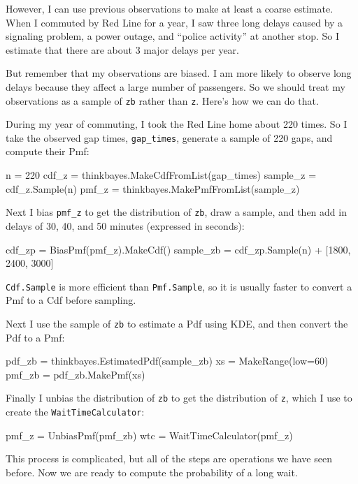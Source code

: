 \documentclass[12pt]{book}
\theoremstyle{exercise}
\begin{document}
However, I can use previous observations to make at least a coarse
estimate.  When I commuted by Red Line for a year, I saw three long
delays caused by a signaling problem, a power outage, and ``police
activity'' at another stop.  So I estimate that there are about
3 major delays per year.

But remember that my observations are biased.  I am more likely
to observe long delays because they affect a large number
of passengers.  So we should treat my observations as a sample
of {\tt zb} rather than {\tt z}.  Here's how we can do that.

During my year of commuting, I took the Red Line home about 220
times.  So I take the observed gap times, \verb"gap_times",
generate a sample of 220 gaps, and compute their Pmf:

\begin{code}
    n = 220
    cdf_z = thinkbayes.MakeCdfFromList(gap_times)
    sample_z = cdf_z.Sample(n)
    pmf_z = thinkbayes.MakePmfFromList(sample_z)
\end{code}

Next I bias \verb"pmf_z" to get the distribution of
{\tt zb}, draw a sample, and then add in delays of
30, 40, and 50 minutes (expressed in seconds):

\begin{code}
    cdf_zp = BiasPmf(pmf_z).MakeCdf()
    sample_zb = cdf_zp.Sample(n) + [1800, 2400, 3000]
\end{code}

{\tt Cdf.Sample} is more efficient than {\tt Pmf.Sample}, so it
is usually faster to convert a Pmf to a Cdf before sampling.

Next I use the sample of {\tt zb} to estimate a Pdf using
KDE, and then convert the Pdf to a Pmf:

\begin{code}
    pdf_zb = thinkbayes.EstimatedPdf(sample_zb)
    xs = MakeRange(low=60)
    pmf_zb = pdf_zb.MakePmf(xs)
\end{code}

Finally I unbias the distribution of {\tt zb} to get the
distribution of {\tt z}, which I use to create the
{\tt WaitTimeCalculator}:

\begin{code}
    pmf_z = UnbiasPmf(pmf_zb)
    wtc = WaitTimeCalculator(pmf_z)
\end{code}

This process is complicated, but
all of the steps are operations we have seen before.
Now we are ready to compute the probability of a long wait.
\end{document}
